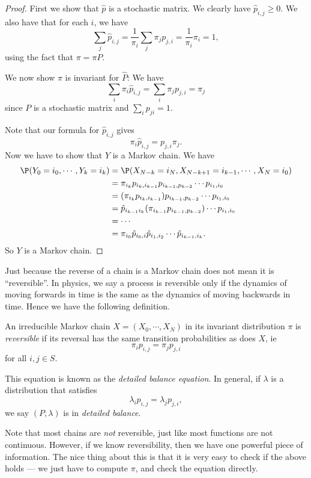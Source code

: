 \documentclass[a4paper]{article}
\begin{document}
\begin{proof}
  First we show that $\hat{p}$ is a stochastic matrix. We clearly have $\hat{p}_{i,j} \geq 0$. We also have that for each $i$, we have
  \[
    \sum_j \hat{p}_{i, j} = \frac{1}{\pi_i} \sum_j \pi_j p_{j, i} = \frac{1}{\pi_i} \pi_i = 1,
  \]
  using the fact that $\pi = \pi P$.

  We now show $\pi$ is invariant for $\hat{P}$: We have
  \[
    \sum_i \pi_i \hat{p}_{i, j} = \sum_i \pi_j p_{j, i} = \pi_j
  \]
  since $P$ is a stochastic matrix and $\sum_i p_{ji} = 1$.

  Note that our formula for $\hat{p}_{i,j}$ gives
  \[
    \pi_i \hat{p}_{i, j} = p_{j, i} \pi_j.
  \]
  Now we have to show that $Y$ is a Markov chain. We have
  \begin{align*}
    \P(Y_0 = i_0, \cdots, Y_k = i_k) &= \P(X_{N - k} = i_N, X_{N - k + 1} = i_{k - 1}, \cdots, X_N = i_0)\\
    &= \pi_{i_k} p_{i_k, i_{k - 1}} p_{i_{k - 1}, p_{k - 2}} \cdots p_{i_1, i_0}\\
    &= (\pi_{i_k} p_{i_k, i_{k - 1}}) p_{i_{k - 1}, p_{k - 2}} \cdots p_{i_1, i_0}\\
    &= \hat{p}_{i_{k - 1} i_k} (\pi_{i_{k - 1}} p_{i_{k - 1}, p_{k - 2}}) \cdots p_{i_1, i_0}\\
    &= \cdots\\
    &= \pi_{i_0} \hat{p}_{i_0, i} \hat{p}_{i_1, i_2} \cdots \hat{p}_{i_{k - 1}, i_k}.
  \end{align*}
  So $Y$ is a Markov chain.
\end{proof}

Just because the reverse of a chain is a Markov chain does not mean it is ``reversible''. In physics, we say a process is reversible only if the dynamics of moving forwards in time is the same as the dynamics of moving backwards in time. Hence we have the following definition.

\begin{defi}
  An irreducible Markov chain $X = (X_0, \cdots, X_N)$ in its invariant distribution $\pi$ is \emph{reversible} if its reversal has the same transition probabilities as does $X$, ie
  \[
    \pi_i p_{i, j} = \pi_j p_{j, i}
  \]
  for all $i, j \in S$.

  This equation is known as the \emph{detailed balance equation}. In general, if $\lambda$ is a distribution that satisfies
  \[
    \lambda_i p_{i, j} = \lambda_j p_{j, i},
  \]
  we say $(P, \lambda)$ is in \emph{detailed balance}.
\end{defi}
Note that most chains are \emph{not} reversible, just like most functions are not continuous. However, if we know reversibility, then we have one powerful piece of information. The nice thing about this is that it is very easy to check if the above holds --- we just have to compute $\pi$, and check the equation directly.
\end{document}
